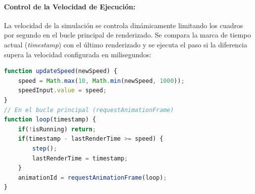 \documentclass[12pt,a4paper]{article}
\begin{document}
\paragraph{Control de la Velocidad de Ejecución:}
La velocidad de la simulación se controla dinámicamente limitando los cuadros por segundo en el bucle principal de renderizado. Se compara la marca de tiempo actual (\textit{timestamp}) con el último renderizado y se ejecuta el paso si la diferencia supera la velocidad configurada en milisegundos:
\begin{lstlisting}[language=JavaScript]
function updateSpeed(newSpeed) {
    speed = Math.max(10, Math.min(newSpeed, 1000));
    speedInput.value = speed;
}
// En el bucle principal (requestAnimationFrame)
function loop(timestamp) {
    if(!isRunning) return;
    if(timestamp - lastRenderTime >= speed) {
        step();
        lastRenderTime = timestamp;
    }
    animationId = requestAnimationFrame(loop);
}
\end{lstlisting}
\end{document}
